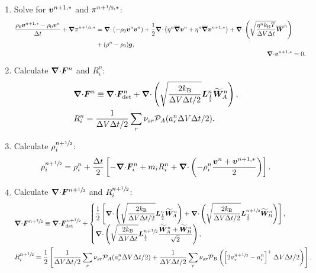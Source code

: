\documentclass[
10pt
showpacs, showkeys,
amsmath,amssymb,
aps,
pre,
floatfix,
]{revtex4-1}
\newcommand{\divg}{{\V\nabla\cdot}}                       %
\begin{document}
\begin{enumerate}

\item Solve for $\boldsymbol{v}^{n+1,*}$ and $\pi^{n+\sfrac{1}{2},*}$:
\begin{align}
\label{boussinesq_stokes_v_1st}
\begin{split}
\frac{\rho_0\V{v}^{n+1,*}-\rho_0\V{v}^n}{\D{t}} + \grad\pi^{n+\myhalf,*}
& = \divg\left(-\rho_0\V{v}^n\V{v}^n\right) + 
\frac{1}{2}\divg\left( \eta^n \overline{\grad}\V{v}^n + \eta^n \overline{\grad}\V{v}^{n+1,*} \right)
+ \divg\left( \sqrt{\frac{\eta^n k_\mathrm{B}T}{\D{V}\D{t}} } \overline{\V{W}}^n \right)
\\
& + (\rho^n-\rho_0)\V{g},
\end{split}
\\
\label{boussinesq_stokes_p_1st}
\divg\V{v}^{n+1,*} & = 0.
\end{align}

\item Calculate $\divg\V{F}^n$ and $R^n_i$:
\begin{align}
\label{boussinesq_fluxdiv_2nd}
& \divg\V{F}^n \equiv \divg\V{F}_\mathrm{det}^n + \divg\left( \sqrt{ \frac{2k_\mathrm{B}}{\D{V}\D{t}/2} } \V{L}^n_{\frac12} \widetilde{\V{W}}^n_A \right), \\
\label{boussinesq_chemrate_2nd}
& R^n_i = \frac{1}{\D{V}\D{t}/2}\sum_r \nu_{sr}\mathcal{P}_A(a^n_r\D{V}\D{t}/2).
\end{align}

\item Calculate $\rho^{n+\sfrac{1}{2}}_i$:
\begin{equation}
\rho^{n+\myhalf}_i = \rho^n_i + \frac{\D{t}}{2} \left[ -\divg\V{F}^n_i + m_i R^n_i + \divg\left( -\rho^n_i \frac{\V{v}^n+\V{v}^{n+1,*}}{2} \right) \right].
\end{equation}

\item Calculate $\divg\V{F}^{n+\myhalf}$ and $R^{n+\sfrac{1}{2}}_i$:
\begin{align}
&\divg\V{F}^{n+\myhalf} \equiv \divg\V{F}_\mathrm{det}^{n+\myhalf} +
\begin{cases} 
\displaystyle
\frac{1}{2}\left[ 
\divg\left( \sqrt{ \frac{2k_\mathrm{B}}{\D{V}\D{t}/2} } \V{L}^n_{\frac12} \widetilde{\V{W}}^n_A \right) 
+\divg\left( \sqrt{ \frac{2k_\mathrm{B}}{\D{V}\D{t}/2} } \V{L}^{n+\myhalf}_{\frac12} \widetilde{\V{W}}^n_B \right) 
\right], \\
\displaystyle
\divg\left( \sqrt{ \frac{2k_\mathrm{B}}{\D{V}\D{t}} } \V{L}^{n+\myhalf}_{\frac12} \frac{\widetilde{\V{W}}^n_A+\widetilde{\V{W}}^n_B}{\sqrt{2}} \right),
\end{cases}
\\
&R^{n+\myhalf}_i = \frac{1}{2}\left[ \frac{1}{\D{V}\D{t}/2} \sum_r \nu_{sr} \mathcal{P}_A(a^n_r\D{V}\D{t}/2) + \frac{1}{\D{V}\D{t}/2} \sum_r \nu_{sr} \mathcal{P}_B\left( \left[ 2 a^{n+\myhalf}_r - a^n_r \right]^+ \D{V}\D{t}/2 \right) \right].
\end{align}


\end{enumerate}
\end{document}
